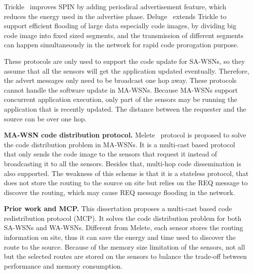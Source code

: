 Trickle~\cite{trickle} improves SPIN by adding periodical advertisement feature, which reduces the energy used in the 
advertise phase. Deluge~\cite{deluge} extends Trickle to support efficient flooding of large data especially code 
images, by dividing big code image into fixed sized segments, and the transmission of different segments can happen 
simultaneously in the network for rapid code prorogation purpose. 

These protocols are only used to support the code update for SA-WSNs, so they assume that all the sensors will get the 
application updated eventually. Therefore, the advert messages only need to be broadcast one hop away.
These protocols cannot handle the software update in MA-WSNs.
Because MA-WSNs support concurrent application execution, only part of the sensors may be running the application that 
is recently updated. 
The distance between the requester and the source can be over one hop.

\textbf{MA-WSN code distribution protocol.}
 Melete~\cite{melete} protocol is proposed to solve the code distribution problem in MA-WSNs.
It is a multi-cast based protocol that only sends the code image to the sensors that request it instead of broadcasting 
it to all the sensors. Besides that, multi-hop code dissemination is also supported. The weakness of this scheme is 
that it is a stateless protocol, that does not store the routing to the source on site but relies on the REQ message to 
discover the routing, which may cause REQ message flooding in the network.


\textbf{Prior work and MCP.}
This dissertation proposes a multi-cast based code redistribution protocol (MCP).
It solves the code distribution problem for both SA-WSNs and WA-WSNs.
Different from Melete, each sensor stores the routing information on site, thus
it can save the energy and time used to discover the route to the source.
Because of the memory size limitation of the sensors, not all but the selected routes
are stored on the sensors to balance the trade-off between performance and memory consumption.

